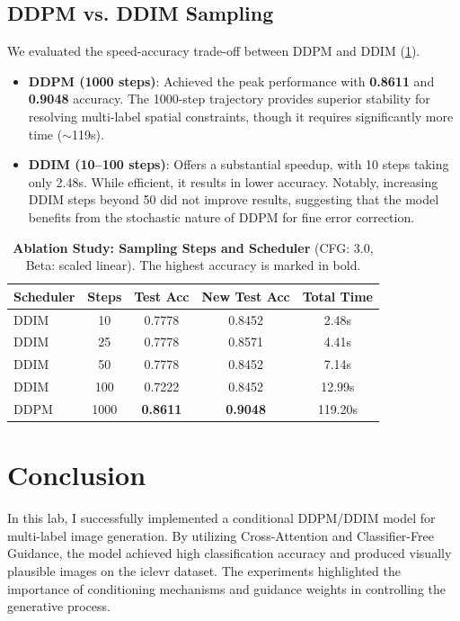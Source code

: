 \documentclass[10pt,twocolumn,letterpaper]{article}
\begin{document}
\subsection*{DDPM vs. DDIM Sampling}

We evaluated the speed-accuracy trade-off between DDPM and DDIM
(\cref{tab:steps-ablation}).
\begin{itemize}[itemsep=-3pt]
  \item \textbf{DDPM (1000 steps)}: Achieved the peak performance with
    \textbf{0.8611} and \textbf{0.9048} accuracy. The 1000-step trajectory
    provides superior stability for resolving multi-label spatial constraints,
    though it requires significantly more time ($\sim$119s).
  \item \textbf{DDIM (10--100 steps)}: Offers a substantial speedup, with
    10 steps taking only 2.48s. While efficient, it results in lower accuracy.
    Notably, increasing DDIM steps beyond 50 did not improve results, suggesting
    that the model benefits from the stochastic nature of DDPM for fine error
    correction.
\end{itemize}

\begin{table}[H]
  \centering
  \small
  \begin{tabular}{@{}lcccc@{}}
    \toprule
    \textbf{Scheduler} & \textbf{Steps} & \textbf{Test Acc} & \textbf{New Test Acc} & \textbf{Total Time} \\
    \midrule
    DDIM & 10    & 0.7778 & 0.8452 & 2.48s \\
    DDIM & 25    & 0.7778 & 0.8571 & 4.41s \\
    DDIM & 50    & 0.7778 & 0.8452 & 7.14s \\
    DDIM & 100   & 0.7222 & 0.8452 & 12.99s \\
    DDPM & 1000  & \textbf{0.8611} & \textbf{0.9048} & 119.20s \\
    \bottomrule
  \end{tabular}
  \caption{\textbf{Ablation Study: Sampling Steps and Scheduler} (CFG: 3.0,
    Beta: scaled linear). The highest accuracy is marked in bold.}
  \label{tab:steps-ablation}
\end{table}

\section{Conclusion}

In this lab, I successfully implemented a conditional DDPM/DDIM model for
multi-label image generation. By utilizing Cross-Attention and Classifier-Free
Guidance, the model achieved high classification accuracy and produced visually
plausible images on the iclevr dataset. The experiments highlighted the importance
of conditioning mechanisms and guidance weights in controlling the generative
process.
\end{document}
